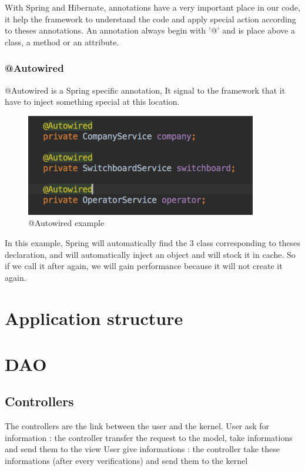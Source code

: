 With Spring and Hibernate, annotations have a very important place in our code, it help the framework to understand the code and apply special action according to theses annotations.
An annotation always begin with '@' and is place above a class, a method or an attribute.

\subsubsection{@Autowired}
@Autowired is a Spring specific annotation, It signal to the framework that it have to inject something special at this location.

\begin{figure}[!ht]
  \caption{@Autowired example}
  \centering
    \includegraphics[width=0.9\textwidth]{img/autowired.png}
\end{figure}

In this example, Spring will automatically find the 3 class corresponding to theses declaration, and will automatically inject an object and will stock it in cache. So if we call it after again, we will gain performance because it will not create it again.



\section{Application structure}


\section{DAO}
\subsection{Controllers}

The controllers are the link between the user and the kernel.
User ask for information : the controller transfer the request to the model, take informations and send them to the view
User give informations : the controller take these informations (after every verifications) and send them to the kernel


